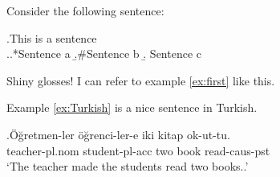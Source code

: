 \documentclass{article}
\title{}
\author{}
\date{}
\begin{document}
Consider the following sentence:

\ex.This is a sentence \label{ex:first}\\

\ex.\a.*Sentence a %
    \b.\#Sentence b
    \b. Sentence c
    
Shiny glosses!  I can refer to example \ref{ex:first} like this. %

Example \ref{ex:Turkish} is a nice sentence in Turkish.

\exg.Öğretmen-ler öğrenci-ler-e iki kitap ok-ut-tu. \label{ex:Turkish}\\
       teacher-{\sc pl.nom} student-{\sc pl-acc} two book read-{\sc caus-pst}\\ %
        `The teacher made the students read two books..'








\end{document}
